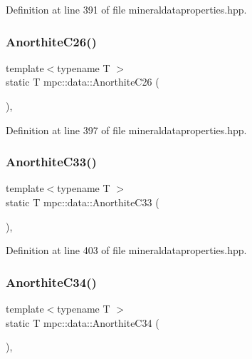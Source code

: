 Definition at line 391 of file mineraldataproperties.\+hpp.

\mbox{\label{namespacempc_1_1data_aea565664af21c893696ef12e775681ff}} 
\subsubsection{\texorpdfstring{Anorthite\+C26()}{AnorthiteC26()}}
{\footnotesize\ttfamily template$<$typename T $>$ \\
static T mpc\+::data\+::\+Anorthite\+C26 (\begin{DoxyParamCaption}{ }\end{DoxyParamCaption})\hspace{0.3cm}{\ttfamily [inline]}, {\ttfamily [static]}}



Definition at line 397 of file mineraldataproperties.\+hpp.

\mbox{\label{namespacempc_1_1data_a0719f9e8928aa464328f15e4dab004af}} 
\subsubsection{\texorpdfstring{Anorthite\+C33()}{AnorthiteC33()}}
{\footnotesize\ttfamily template$<$typename T $>$ \\
static T mpc\+::data\+::\+Anorthite\+C33 (\begin{DoxyParamCaption}{ }\end{DoxyParamCaption})\hspace{0.3cm}{\ttfamily [inline]}, {\ttfamily [static]}}



Definition at line 403 of file mineraldataproperties.\+hpp.

\mbox{\label{namespacempc_1_1data_a69c2b40eabe6b2e0db91f16326e6940e}} 
\subsubsection{\texorpdfstring{Anorthite\+C34()}{AnorthiteC34()}}
{\footnotesize\ttfamily template$<$typename T $>$ \\
static T mpc\+::data\+::\+Anorthite\+C34 (\begin{DoxyParamCaption}{ }\end{DoxyParamCaption})\hspace{0.3cm}{\ttfamily [inline]}, {\ttfamily [static]}}



